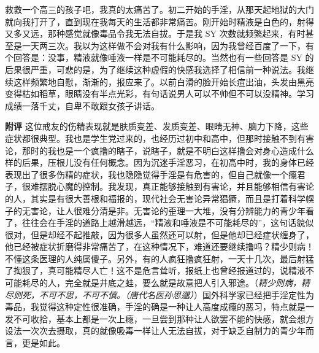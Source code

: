 \begin{case}
    救救一个高三的孩子吧，我真的太痛苦了。初二开始的手淫，从那天起地狱的大门就向我打开了，直到现在我每天的生活都非常痛苦。刚开始时精液是白色的，射得又多又远，那种感觉就像毒品令我无法自拔。于是我 SY 次数就频繁起来，有时甚至是一天两三次。我以为这样做不会对我有什么影响，因为我曾经百度了一下，有个回答是：没事，精液就像唾液一样是不可能耗尽的。当然也有一些回答是 SY 的后果很严重，可悲的是，为了继续这种虚假的快感我选择了相信前一种说法。我继续这样频繁地自慰，渐渐的，报应来了。以前白滑的脸开始长痘出油，头发由黑亮变得枯如稻草，眼睛没有半点光彩，有句话说男人可以不帅但不可以没精神。学习成绩一落千丈，自卑不敢跟女孩子讲话。

    \textbf{附评} 这位戒友的伤精表现就是肤质变差、发质变差、眼睛无神、脑力下降，这些症状都很典型。我也是学生党过来的，也经历过初中和高中，但那时接触不到有害论，那时的我也是一个疯撸的瞎子，说瞎子，就是不明白这样撸会对身心造成什么样的后果，压根儿没有任何概念。因为沉迷手淫恶习，在初高中时，我的身体已经表现出了很多伤精的症状，我也隐隐觉得手淫是有危害的，但自己就像一个瘾君子，很难摆脱心魔的控制。我发现，真正能够接触到有害论，并且能够相信有害论的人，其实是有很大善根和福报的，现代社会无害论异常猖獗，而且是打着科学幌子的无害论，让人很难分清是非。无害论的歪理一大堆，没有分辨能力的青少年看了，往往会在手淫的道路上越滑越远，“精液和唾液是不可能耗尽的”，这句话貌似很对，但是却经不起推敲，因为很多人虽然还可以射，但是他却已经症状缠身了，他已经被症状折磨得非常痛苦了，在这种情况下，难道还要继续撸吗？精少则病！不懂这条医理的人纯属傻子。另外，有的人疯狂撸疯狂射，一天十几次，最后射猛了掏狠了，真可能精尽人亡！这不是危言耸听，报纸上也曾经报道过的，说精液不可能耗尽的人，完全就是井底之蛙，要么就是故意把人引入邪途。（\textit{精少则病，精尽则死，不可不思，不可不慎。（唐代名医孙思邈）}）国外科学家已经把手淫定性为毒品，我觉得这种定性很准确，手淫的确是一种让人高度成瘾的恶习，特点就是一发不可收拾，基本上都是一次上瘾，一旦尝到那种让人欲罢不能的快感，就会想方设法一次次去摄取，真的就像吸毒一样让人无法自拔，对于缺乏自制力的青少年而言，更是如此。
\end{case}

